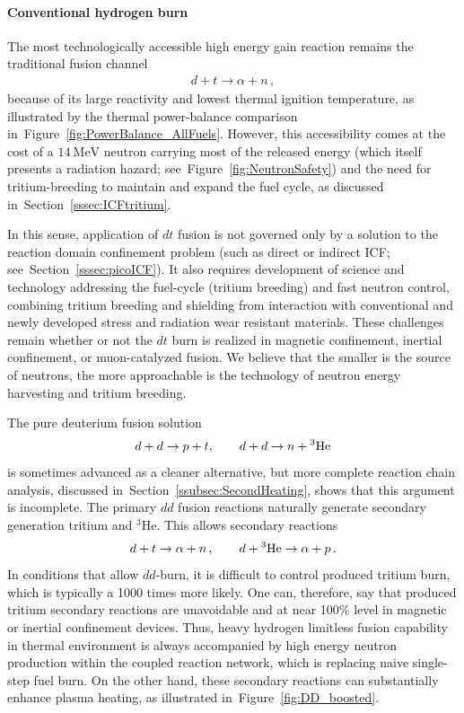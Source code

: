 \documentclass[particles,article,accept,pdftex,moreauthors]{Definitions/mdpi}
\newcommand{\rf}[1]{Figure~\ref{#1}}
\newcommand{\rsec}[1]{Section~\ref{#1}}
\begin{document}
\paragraph*{\bf Conventional hydrogen burn}
The most technologically accessible high energy gain reaction remains the traditional fusion channel
\begin{align}
 d+t\to \alpha+n\,,
\end{align}
because of its large reactivity and lowest thermal ignition temperature, as illustrated by the thermal power-balance comparison in~\rf{fig:PowerBalance_AllFuels}. However, this accessibility comes at the cost of a $14~\mathrm{MeV}$ neutron carrying most of the released energy (which itself presents a radiation hazard; see~\rf{fig:NeutronSafety}) and the need for tritium-breeding to maintain and expand the fuel cycle, as discussed in~\rsec{sssec:ICFtritium}. 

In this sense, application of $dt$ fusion is not governed only by a solution to the reaction domain confinement problem (such as direct or indirect ICF; see~\rsec{sssec:picoICF}). It also requires development of science and technology addressing the fuel-cycle (tritium breeding) and fast neutron control, combining tritium breeding and shielding from interaction with conventional and newly developed stress and radiation wear resistant materials. These challenges remain whether or not the $dt$ burn is realized in magnetic confinement, inertial confinement, or muon-catalyzed fusion. We believe that the smaller is the source of neutrons, the more approachable is the technology of neutron energy harvesting and tritium breeding.

The pure deuterium fusion solution
\begin{align}
d+d\to p+t,\qquad d+d\to n+{}^3{\rm He}
\end{align}
is sometimes advanced as a cleaner alternative, but more complete reaction chain analysis, discussed in~\rsec{ssubsec:SecondHeating}, shows that this argument is incomplete. The primary $dd$ fusion reactions naturally generate secondary generation tritium and ${}^3\mathrm{He}$. This allows secondary reactions
\begin{align}
 d+t\to \alpha+n\,,\qquad
 d+{}^3{\rm He}\to \alpha+p\,.
\end{align}
In conditions that allow $dd$-burn, it is difficult to control produced tritium burn, which is typically a 1000 times more likely. One can, therefore, say that produced tritium secondary reactions are unavoidable and at near 100\% level in magnetic or inertial confinement devices. Thus, heavy hydrogen limitless fusion capability in thermal environment is always accompanied by high energy neutron production within the coupled reaction network, which is replacing naive single-step fuel burn. On the other hand, these secondary reactions can substantially enhance plasma heating, as illustrated in~\rf{fig:DD_boosted}.
\end{document}
